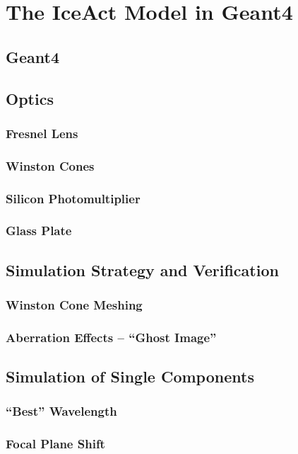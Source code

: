 \chapter{The IceAct Model in Geant4}

\section{Geant4}

\section{Optics}

\subsection{Fresnel Lens}

\subsection{Winston Cones}

\subsection{Silicon Photomultiplier}

\subsection{Glass Plate}

\section{Simulation Strategy and Verification}

\subsection{Winston Cone Meshing}

\subsection{Aberration Effects -- \enquote{Ghost Image}}

\section{Simulation of Single Components}

\subsection{\enquote{Best} Wavelength}

\subsection{Focal Plane Shift}
